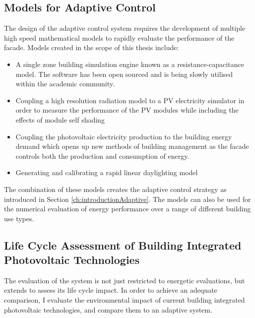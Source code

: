 \subsection{Models for Adaptive Control}
The design of the adaptive control system requires the development of multiple high speed mathematical models to rapidly evaluate the performance of the facade. Models created in the scope of this thesis include:
\begin{itemize}
\item A single zone building simulation engine known as a resistance-capacitance model. The software has been open sourced and is being slowly utilised within the academic community. 
\item Coupling a high resolution radiation model to a PV electricity simulator in order to measure the performance of the PV modules while including the effects of module self shading
\item Coupling the photovoltaic electricity production to the building energy demand which opens up new methods of building management as the facade controls both the production and consumption of energy. 
\item Generating and calibrating a rapid linear daylighting model 
\end{itemize}

The combination of these models creates the adaptive control strategy as introduced in Section \ref{ch:introductionAdaptive}. The models can also be used for the numerical evaluation of energy performance over a range of different building use types.

\subsection{Life Cycle Assessment of Building Integrated Photovoltaic Technologies}
The evaluation of the system is not just restricted to energetic evaluations, but extends to assess its life cycle impact. In order to achieve an adequate comparison, I evaluate the environmental impact of current building integrated photovoltaic technologies, and compare them to an adaptive system. 



